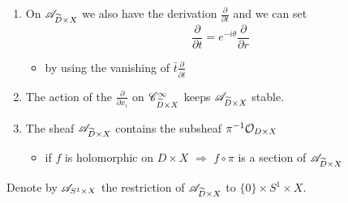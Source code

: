 \begin{enumerate}
  \item On $\mathscr{A}_{\widetilde D\times X}$ we also have the derivation
    $\frac{\partial}{\partial t}$ and we can set
    \[
      \frac{\partial}{\partial t}=e^{-i\theta}\frac{\partial}{\partial r}
    \]
    \begin{itemize}
      \item by using the vanishing of $\bar t\frac{\partial}{\partial\bar t}$
    \end{itemize}
  \item The action of the $\frac{\partial}{\partial x_i}$ on
    $\mathscr{C}_{\widetilde D\times X}^\infty$ keeps $\mathscr{A}_{\widetilde D\times X}$ stable.
  \item The sheaf $\mathscr{A}_{\widetilde D\times X}$ contains the subsheaf
    $\pi^{-1}\mathcal{O}_{D\times X}$
    \begin{itemize}
      \item if $f$ is holomorphic on $D\times X$ $\Rightarrow$ $f\circ\pi$ is
        a section of $\mathscr{A}_{\widetilde D\times X}$
    \end{itemize}
\end{enumerate}
Denote by $\mathscr{A}_{S^1\times X}$ the restriction of $\mathscr{A}_{\widetilde D\times X}$ to
$\{0\}\times S^1\times X$.
